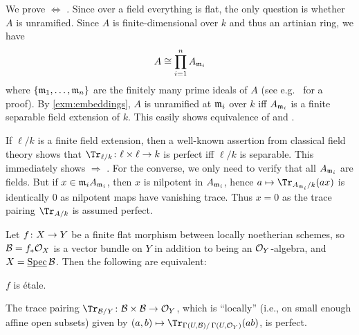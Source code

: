 \begin{proof*}
	We prove  $\Leftrightarrow$ . Since over a field everything is flat, the only question is whether $A$ is unramified. Since $A$ is finite-dimensional over $k$ and thus an artinian ring, we have 
	\begin{equation*}
		A\cong \prod_{i=1}^nA_{\mathfrak{m}_i}
	\end{equation*}
	where $\{\mathfrak{m}_1,\dotsc,\mathfrak{m}_n\}$ are the finitely many prime ideals of $A$ (see e.g.\ \cite[Corollary~2.16]{eisenbudCommAlg} for a proof). By \cref{exm:embeddings}, $A$ is unramified at $\mathfrak{m}_i$ over $k$ iff $A_{\mathfrak{m}_i}$ is a finite separable field extension of $k$. This easily shows equivalence of  and .
	
	If $\ell/k$ is a finite field extension, then a well-known assertion from classical field theory shows that $\Tr_{\ell/k}\colon \ell\times\ell\morphism k$ is perfect iff $\ell/k$ is separable. This immediately shows  $\Rightarrow$ . For the converse, we only need to verify that all $A_{\mathfrak{m}_i}$ are fields. But if $x\in\mathfrak{m}_iA_{\mathfrak{m}_i}$, then $x$ is nilpotent in $A_{\mathfrak{m}_i}$, hence $a\mapsto \Tr_{A_{\mm_i}/k}(ax)$ is identically $0$ as nilpotent maps have vanishing trace. Thus $x=0$ as the trace pairing $\Tr_{A/k}$ is assumed perfect.
\end{proof*}
\begin{prop}\label{prop:finiteEtale}
	Let $f\colon X\morphism Y$ be a finite flat morphism between locally noetherian schemes, so $\mathcal{B}=f_*\mathcal{O}_X$ is a vector bundle on $Y$ in addition to being an $\mathcal{O}_Y$-algebra, and $X=\operatorname{\underline{\smash{\mathrm{Spec}}}} \mathcal{B}$. Then the following are equivalent:
	\begin{alphanumerate}
		\item $f$ is étale.
		\item The trace pairing $\Tr_{\Bb/Y}\colon \Bb\times\Bb\morphism\Oo_Y$, which is \enquote{locally} (i.e., on small enough affine open subsets)  given by $(a,b)\mapsto \Tr_{\Global(U,\Bb)/\Global(U,\Oo_Y)}(ab)$, is perfect.
	\end{alphanumerate}
\end{prop}
